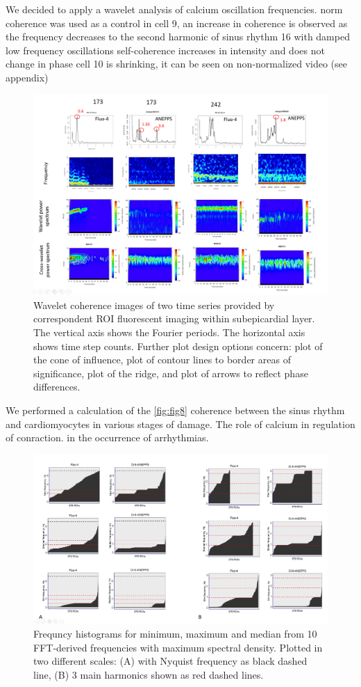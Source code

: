 \documentclass{biophys-new}
\begin{document}
We decided to apply a wavelet analysis of calcium oscillation frequencies. \cite{addison2018introduction}
norm coherence was used as a control
in cell 9, an increase in coherence is observed as the frequency decreases to the second harmonic of sinus rhythm
16 with damped low frequency oscillations
self-coherence increases in intensity and does not change in phase
cell 10 is shrinking, it can be seen on non-normalized video (see appendix)

\begin{figure}[hbt!]
\centering
\includegraphics[width=0.9\linewidth]{fig10.png}
\caption{Wavelet coherence images of two time series provided by correspondent ROI fluorescent imaging within subepicardial layer.
The vertical axis shows the Fourier periods. The horizontal axis shows time step counts.
Further plot design options concern: plot of the cone of influence, plot of contour lines to border areas of significance, plot of the ridge, and plot of arrows to reflect phase differences.}
\label{fig:fig10}
\end{figure}


We performed a calculation of the \ref{fig:fig8} coherence between the sinus rhythm and cardiomyocytes in various stages of damage.
The role of calcium in regulation of conraction.
in the occurrence of arrhythmias.

\begin{figure}
    \includegraphics[width=0.9\linewidth]{fig11.png}
    \caption{Frequncy histograms for minimum, maximum and median from 10 FFT-derived frequencies with maximum spectral density. Plotted in two different scales: (A) with Nyquist frequency as black dashed line, (B) 3 main harmonics shown as red dashed lines.}
    \label{fig:fig11}
\end{figure}
\end{document}
